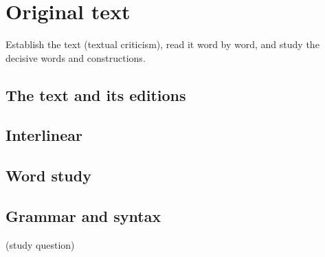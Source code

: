 \chapter{Original text}\label{cap:original}

\begin{objetivo}
Establish the text (textual criticism), read it word by word, and study the decisive words and constructions.
\end{objetivo}

\section{The text and its editions}

\section{Interlinear}

\section{Word study}

\section{Grammar and syntax}

\begin{pergunta}
(study question)
\end{pergunta}
